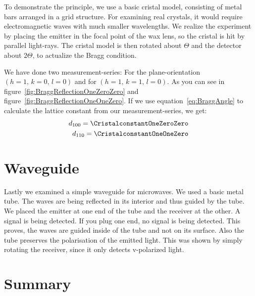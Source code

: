 \documentclass[a4paper,10pt,twocolumn]{article}
\begin{document}
    To demonstrate the principle, we use a basic cristal model, consisting of metal bars arranged in a grid structure.
    For examining real crystals, it would require electromagnetic waves with much smaller wavelengths.
    We realize the experiment by placing the emitter in the focal point of the wax lens, so the cristal is hit by
    parallel light-rays.
    The cristal model is then rotated about $\Theta$ and the detector about $2\Theta$, to actualize the Bragg condition.
    
    We have done two measurement-series: For the plane-orientation $(h=1,\,k=0,\,l=0)$ and for $(h=1,\,k=1,\,l=0)$.
    As you can see in figure~\ref{fig:BraggReflectionOneZeroZero} and figure~\ref{fig:BraggReflectionOneOneZero}.
    If we use equation~\eqref{eq:BraggAngle} to calculate the lattice constant from our measurement-series, we get:
    \begin{align*}
        d_{100} = \CristalconstantOneZeroZero \\
        d_{110} = \CristalconstantOneOneZero
    \end{align*}
    

    \section{Waveguide}
    
    Lastly we examined a simple waveguide for microwaves.
    We used a basic metal tube.
    The waves are being reflected in its interior and thus guided by the tube.
    We placed the emitter at one end of the tube and the receiver at the other.
    A signal is being detected.
    If you plug one end, no signal is being detected.
    This proves, the waves are guided inside of the tube and not on its surface.
    Also the tube preserves the polarisation of the emitted light.
    This was shown by simply rotating the receiver, since it only detects v-polarized light.

    \section{Summary}
    
\end{document}
